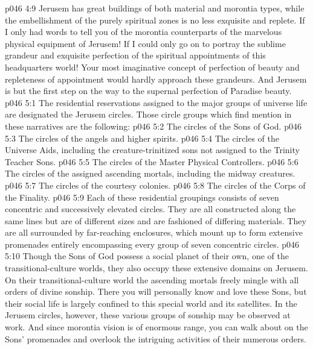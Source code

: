 \vs p046 4:9 Jerusem has great buildings of both material and morontia types, while the embellishment of the purely spiritual zones is no less exquisite and replete. If I only had words to tell you of the morontia counterparts of the marvelous physical equipment of Jerusem! If I could only go on to portray the sublime grandeur and exquisite perfection of the spiritual appointments of this headquarters world! Your most imaginative concept of perfection of beauty and repleteness of appointment would hardly approach these grandeurs. And Jerusem is but the first step on the way to the supernal perfection of Paradise beauty.
\vs p046 5:1 The residential reservations assigned to the major groups of universe life are designated the Jerusem circles. Those circle groups which find mention in these narratives are the following:
\pc \vs p046 5:2 \bibnobreakspace The circles of the Sons of God.
\vs p046 5:3 \bibnobreakspace The circles of the angels and higher spirits.
\vs p046 5:4 \bibnobreakspace The circles of the Universe Aids, including the creature\hyp{}trinitized sons not assigned to the Trinity Teacher Sons.
\vs p046 5:5 \bibnobreakspace The circles of the Master Physical Controllers.
\vs p046 5:6 \bibnobreakspace The circles of the assigned ascending mortals, including the midway creatures.
\vs p046 5:7 \bibnobreakspace The circles of the courtesy colonies.
\vs p046 5:8 \bibnobreakspace The circles of the Corps of the Finality.
\pc \vs p046 5:9 Each of these residential groupings consists of seven concentric and successively elevated circles. They are all constructed along the same lines but are of different sizes and are fashioned of differing materials. They are all surrounded by far\hyp{}reaching enclosures, which mount up to form extensive promenades entirely encompassing every group of seven concentric circles.
\pc \vs p046 5:10 \bibnobreakspace {} Though the Sons of God possess a social planet of their own, one of the transitional\hyp{}culture worlds, they also occupy these extensive domains on Jerusem. On their transitional\hyp{}culture world the ascending mortals freely mingle with all orders of divine sonship. There you will personally know and love these Sons, but their social life is largely confined to this special world and its satellites. In the Jerusem circles, however, these various groups of sonship may be observed at work. And since morontia vision is of enormous range, you can walk about on the Sons’ promenades and overlook the intriguing activities of their numerous orders.
